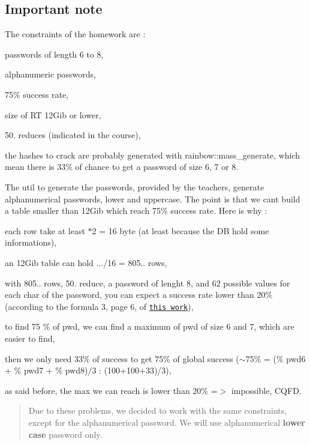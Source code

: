 \subsection*{Important note}

The constraints of the homework are \+:
\begin{DoxyItemize}
\item passwords of length 6 to 8,
\item alphanumeric passwords,
\item 75\% success rate,
\item size of RT 12\+Gib or lower,
\item 50. reduces (indicated in the course),
\item the hashes to crack are probably generated with rainbow\+:\+:mass\+\_\+generate, which mean there is 33\% of chance to get a password of size 6, 7 or 8.
\end{DoxyItemize}

The util to generate the passwords, provided by the teachers, generate alphanumerical passwords, lower and uppercase. The point is that we can\textquotesingle{}t build a table smaller than 12\+Gib which reach 75\% success rate. Here is why \+:
\begin{DoxyItemize}
\item each row take at least {$\ast$2 = 16} byte (at least because the DB hold some informations),
\item an 12\+Gib table can hold {.../16 = 805..} rows,
\item with 805.. rows, 50. reduce, a password of lenght 8, and 62 possible values for each char of the password, you can expect a success rate lower than 20\% (according to the formula 3, page 6, of \href{https://lasecwww.epfl.ch/pub/lasec/doc/Oech03.pdf}{\tt this work}),
\item to find 75 \% of pwd, we can find a maximum of pwd of size 6 and 7, which are easier to find,
\item then we only need 33\% of success to get 75\% of global success ({\ttfamily $\sim$75\% = (\% pwd6 + \% pwd7 + \% pwd8)/3 \+: (100+100+33)/3}),
\item as said before, the max we can reach is lower than 20\% =$>$ impossible, C\+Q\+FD.
\end{DoxyItemize}

\begin{quote}
Due to these problems, we decided to work with the same constraints, except for the alphanumerical password. We will use alphanumerical {\bfseries lower case} password only. \end{quote}


